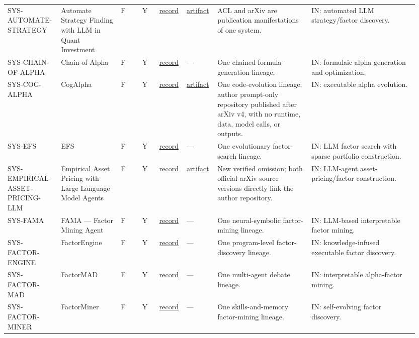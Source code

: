 \begin{longtable}{@{}L{0.12\linewidth}L{0.14\linewidth}L{0.05\linewidth}L{0.04\linewidth}L{0.06\linewidth}L{0.07\linewidth}L{0.22\linewidth}L{0.25\linewidth}@{}}
SYS-\allowbreak{}AUTOMATE-\allowbreak{}STRATEGY & Automate Strategy Finding with LLM in Quant Investment & F & Y & \href{https://aclanthology.org/2025.findings-emnlp.1005/}{record} & \href{https://github.com/kouzhizhuo/Automate-Strategy-Finding-with-LLM-in-Quant-investment}{artifact} & ACL and arXiv are publication manifestations of one system. & IN: automated LLM strategy/factor discovery. \\
SYS-\allowbreak{}CHAIN-\allowbreak{}OF-\allowbreak{}ALPHA & Chain-of-Alpha & F & Y & \href{https://arxiv.org/abs/2508.06312}{record} & --- & One chained formula-generation lineage. & IN: formulaic alpha generation and optimization. \\
SYS-\allowbreak{}COG-\allowbreak{}ALPHA & CogAlpha & F & Y & \href{https://arxiv.org/abs/2511.18850}{record} & \href{https://github.com/uwFengyuan/CogAlpha\_Prompt}{artifact} & One code-evolution lineage; author prompt-only repository published after arXiv v4, with no runtime, data, model calls, or outputs. & IN: executable alpha evolution. \\
SYS-\allowbreak{}EFS & EFS & F & Y & \href{https://arxiv.org/abs/2507.17211}{record} & --- & One evolutionary factor-search lineage. & IN: LLM factor search with sparse portfolio construction. \\
SYS-\allowbreak{}EMPIRICAL-\allowbreak{}ASSET-\allowbreak{}PRICING-\allowbreak{}LLM & Empirical Asset Pricing with Large Language Model Agents & F & Y & \href{https://arxiv.org/abs/2409.17266}{record} & \href{https://github.com/chengjunyan1/AAPM}{artifact} & New verified omission; both official arXiv source versions directly link the author repository. & IN: LLM-agent asset-pricing/factor construction. \\
SYS-\allowbreak{}FAMA & FAMA — Factor Mining Agent & F & Y & \href{https://aclanthology.org/2024.findings-acl.233/}{record} & --- & One neural-symbolic factor-mining lineage. & IN: LLM-based interpretable factor mining. \\
SYS-\allowbreak{}FACTOR-\allowbreak{}ENGINE & FactorEngine & F & Y & \href{https://arxiv.org/abs/2603.16365}{record} & --- & One program-level factor-discovery lineage. & IN: knowledge-infused executable factor discovery. \\
SYS-\allowbreak{}FACTOR-\allowbreak{}MAD & FactorMAD & F & Y & \href{https://doi.org/10.1145/3768292.3770377}{record} & --- & One multi-agent debate lineage. & IN: interpretable alpha-factor mining. \\
SYS-\allowbreak{}FACTOR-\allowbreak{}MINER & FactorMiner & F & Y & \href{https://arxiv.org/abs/2602.14670}{record} & --- & One skills-and-memory factor-mining lineage. & IN: self-evolving factor discovery. \\

\end{longtable}
